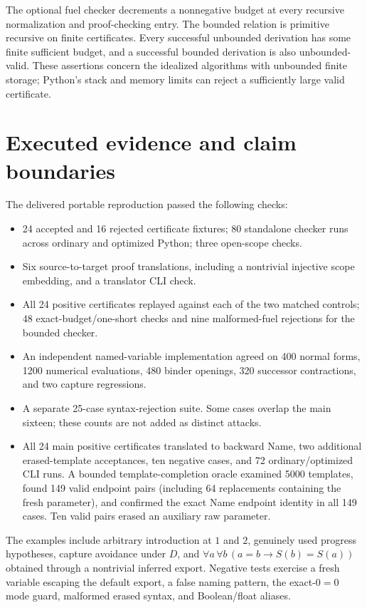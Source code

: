 \documentclass[11pt,letterpaper]{article}
\theoremstyle{definition}\newtheorem{definition}[theorem]{Definition}
\theoremstyle{remark}\newtheorem{remark}[theorem]{Remark}
\begin{document}
The optional fuel checker decrements a nonnegative budget at every
recursive normalization and proof-checking entry. The bounded relation
is primitive recursive on finite certificates. Every successful
unbounded derivation has some finite sufficient budget, and a successful
bounded derivation is also unbounded-valid. These assertions concern the
idealized algorithms with unbounded finite storage; Python's stack and
memory limits can reject a sufficiently large valid certificate.

\section{Executed evidence and claim boundaries}\label{sec:evidence}
The delivered portable reproduction passed the following checks:
\begin{itemize}
\item 24 accepted and 16 rejected certificate fixtures; 80 standalone
checker runs across ordinary and optimized Python; three open-scope checks.
\item Six source-to-target proof translations, including a nontrivial
injective scope embedding, and a translator CLI check.
\item All 24 positive certificates replayed against each of the two
matched controls; 48 exact-budget/one-short checks and nine malformed-fuel
rejections for the bounded checker.
\item An independent named-variable implementation agreed on 400 normal
forms, 1200 numerical evaluations, 480 binder openings, 320 successor
contractions, and two capture regressions.
\item A separate 25-case syntax-rejection suite. Some cases overlap the
main sixteen; these counts are not added as distinct attacks.
\item All 24 main positive certificates translated to backward Name,
two additional erased-template acceptances, ten negative cases, and
72 ordinary/optimized CLI runs. A bounded template-completion oracle
examined 5000 templates, found 149 valid endpoint pairs (including 64
replacements containing the fresh parameter), and confirmed the exact
Name endpoint identity in all 149 cases. Ten valid pairs erased an
auxiliary raw parameter.
\end{itemize}
The examples include arbitrary introduction at $1$ and $2$, genuinely
used progress hypotheses, capture avoidance under $D$, and
$\forall a\,\forall b\,(a=b\to S(b)=S(a))$ obtained through a nontrivial
inferred export. Negative tests exercise a fresh variable escaping the
default export, a false naming pattern, the exact-$0=0$ mode guard,
malformed erased syntax, and Boolean/float aliases.
\end{document}
